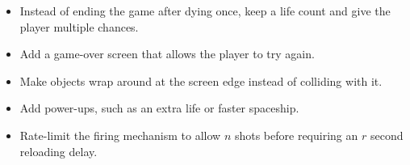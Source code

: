 \documentclass{tufte-handout}
\begin{document}
\begin{itemize}

  \item Instead of ending the game after dying once, keep a life count and
    give the player multiple chances.

   \item Add a game-over screen that allows the player to try again.

   \item Make  objects wrap around at
     the screen edge instead of colliding with it.

   \item Add  power-ups, such as an extra life or faster spaceship.

   \item Rate-limit the firing mechanism to allow $n$ shots before
     requiring an $r$ second reloading delay.

\end{itemize}
\end{document}
